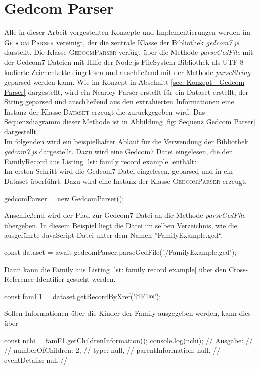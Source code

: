 \section{Gedcom Parser}
\label{sec: Implementierung - Gedcom Parser}
Alle in dieser Arbeit vorgestellten Konzepte und Implementierungen werden im \textsc{Gedcom Parser} vereinigt, der die zentrale Klasse der Bibliothek \textit{gedcom7.js} darstellt. Die Klasse \textsc{GedcomParser} verfügt über die Methode \textit{parseGedFile} mit der Gedcom7 Dateien mit Hilfe der Node.js FileSystem Bibliothek als UTF-8 kodierte Zeichenkette eingelesen und anschließend mit der Methode \textit{parseString} geparsed werden kann. Wie im Konzept in Abschnitt \ref{sec: Konzept - Gedcom Parser} dargestellt, wird ein Nearley Parser erstellt für ein Dataset erstellt, der String geparsed und anschließend aus den extrahierten Informationen eine Instanz der Klasse \textsc{Dataset} erzeugt die zurückgegeben wird. Das Sequenzdiagramm dieser Methode ist in Abbildung \ref{fig: Sequenz Gedcom Parser} dargestellt. \\
Im folgenden wird ein beispielhafter Ablauf für die Verwendung der Bibliothek \textit{gedcom7.js} dargestellt. Dazu wird eine Gedcom7 Datei eingelesen, die den FamilyRecord aus Listing \ref{lst: family record example} enthält:\\
Im ersten Schritt wird die Gedcom7 Datei eingelesen, geparsed und in ein Dataset überführt. Dazu wird eine Instanz der Klasse \textsc{GedcomParser} erzeugt.
\begin{center}
	gedcomParser = new GedcomParser();
\end{center}
Anschließend wird der Pfad zur Gedcom7 Datei an die Methode \textit{parseGedFile} übergeben. In diesem Beispiel liegt die Datei im selben Verzeichnis, wie die ausgeführte JavaScript-Datei unter dem Namen ''FamilyExample.ged``. 
\begin{center}
	const dataset = await gedcomParser.parseGedFile('./FamilyExample.ged');
\end{center}
Dann kann die Family aus Listing \ref{lst: family record example} über den Cross-Reference-Identifier gesucht werden.
\begin{center}
	const famF1 = dataset.getRecordByXref('@F1@');
\end{center}
Sollen Informationen über die Kinder der Family ausgegeben werden, kann dies über 
\begin{center}
	const nchi = famF1.getChildrenInformation();
	console.log(nchi);
	// Ausgabe: 
	// {
	//    numberOfChildren: 2,
	//	  type: null,
	//    parentInformation: null,
	//    eventDetails: null
	// }
\end{center}
